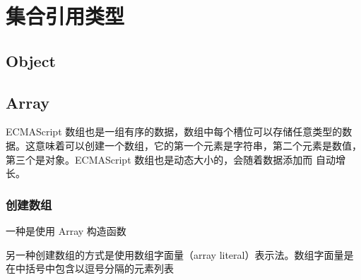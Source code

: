 \chapter{集合引用类型}
\section{Object}
\section{Array}
ECMAScript 数组也是一组有序的数据，数组中每个槽位可以存储任意类型的数据。这意味着可以创建一个数组，它的第一个元素是字符串，第二个元素是数值，第三个是对象。ECMAScript 数组也是动态大小的，会随着数据添加而
自动增长。
\subsection{创建数组}
一种是使用 Array 构造函数

另一种创建数组的方式是使用数组字面量（array literal）表示法。数组字面量是在中括号中包含以逗号分隔的元素列表
\subsection{}
\subsection{}
\subsection{}
\subsection{}
\subsection{}
\subsection{}
\subsection{}
\subsection{}
\subsection{}
